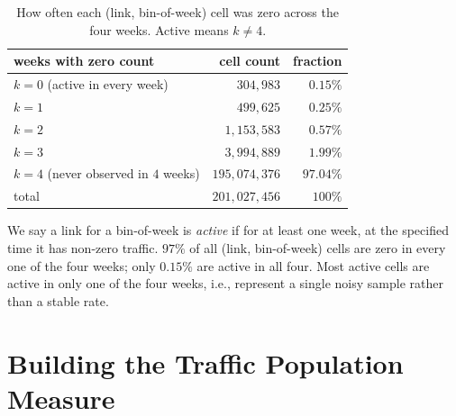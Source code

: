 \documentclass[sigconf, review]{acmart}
\begin{document}
\begin{table}[H]
\centering
\caption{How often each (link, bin-of-week) cell was zero across
the four weeks.  Active means $k \neq 4$.  }
\label{tab:justif-zeros}
\small
\begin{tabular}{lrr}
\toprule
weeks with zero count & cell count & fraction \\
\midrule
$k = 0$ (active in every week)            & $304{,}983$    & $0.15\%$ \\
$k = 1$                                    & $499{,}625$    & $0.25\%$ \\
$k = 2$                                    & $1{,}153{,}583$ & $0.57\%$ \\
$k = 3$                                    & $3{,}994{,}889$ & $1.99\%$ \\
$k = 4$ (never observed in $4$ weeks)     & $195{,}074{,}376$ & $97.04\%$ \\
\midrule
total                                      & $201{,}027{,}456$ & $100\%$ \\
\bottomrule
\end{tabular}
\end{table}

We say a link for a bin-of-week is \emph{active} if for at least one week, at the specified time it has non-zero traffic.  
$97\%$ of all (link, bin-of-week) cells are zero in every one of
the four weeks; only $0.15\%$ are active in all four. Most active cells are active in only one of the
four weeks, i.e., represent a single noisy sample rather than a
stable rate.   















\section{Building the Traffic Population Measure}
\label{sec:prior}

\end{document}
